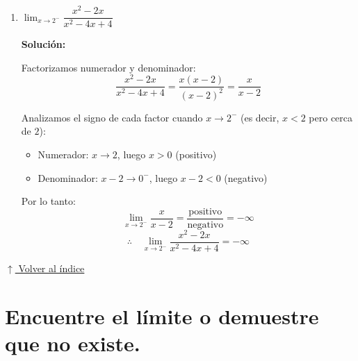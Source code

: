\documentclass[12pt]{article}
\newcommand{\solucion}{%
    \vspace{0.8em}%
    \textbf{Solución:}%
}
\newcommand{\volverindice}{%
    \vspace{1em}%
    \begin{flushright}%
        \hyperlink{indice}{\small $\uparrow$ Volver al índice}%
    \end{flushright}%
}
\begin{document}
\begin{enumerate}[label=\alph*)]
    \solucion

    Cuando $x \to 5^-$ se tiene $e^x \to e^5$ con $e^5 > 0$ (positivo).

    Analizando el denominador: $(x-5)^3$, con $x \to 5^-$ se tiene $(5^- - 5)^3 < 0$ (negativo).

    Por lo tanto:
    \[
        \frac{\text{positivo}}{\text{negativo}} = -\infty
    \]
    \[
        \lim_{x\to5^-}\frac{e^x}{(x-5)^3} = -\infty
    \]

    \item $\lim_{x \to 2^-} \dfrac{x^2 - 2x}{x^2 - 4x + 4}$

    \solucion

    Factorizamos numerador y denominador:
    \[
        \frac{x^2 - 2x}{x^2 - 4x + 4} = \frac{x(x-2)}{(x-2)^2} = \frac{x}{x-2}
    \]

    Analizamos el signo de cada factor cuando $x \to 2^-$ (es decir, $x < 2$ pero cerca de $2$):

    \begin{itemize}
        \item Numerador: $x \to 2$, luego $x > 0$ \quad (positivo)
        \item Denominador: $x - 2 \to 0^-$, luego $x - 2 < 0$ \quad (negativo)
    \end{itemize}

    Por lo tanto:
    \[
        \lim_{x\to2^-}\frac{x}{x-2} = \frac{\text{positivo}}{\text{negativo}} = -\infty
    \]
    \[
        \therefore\quad \lim_{x\to2^-}\frac{x^2-2x}{x^2-4x+4} = -\infty
    \]
\end{enumerate}

\volverindice
\newpage

\section[Límites que no existen]{Encuentre el límite o demuestre que no existe.}
\end{document}
